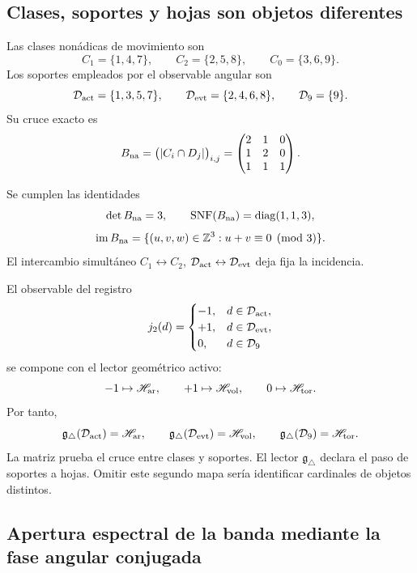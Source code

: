 \subsection{Clases, soportes y hojas son objetos diferentes}

Las clases nonádicas de movimiento son
\[
 C_1=\{1,4,7\},\qquad C_2=\{2,5,8\},\qquad C_0=\{3,6,9\}.
\]
Los soportes empleados por el observable angular son
\[
 \mathcal D_{\rm act}=\{1,3,5,7\},\qquad
 \mathcal D_{\rm evt}=\{2,4,6,8\},\qquad
 \mathcal D_9=\{9\}.
\]
Su cruce exacto es
\[
 B_{\rm na}=\bigl(|C_i\cap D_j|\bigr)_{i,j}
 =\begin{pmatrix}2&1&0\\1&2&0\\1&1&1\end{pmatrix}.
\]

\begin{theorem}
\label{p12-83-c16-s3:thm:incidencia-triadica-corta}
Se cumplen las identidades
\[
 \det B_{\rm na}=3,
 \qquad
 \operatorname{SNF}(B_{\rm na})=\operatorname{diag}(1,1,3),
\]
\[
 \operatorname{im}B_{\rm na}
 =\{(u,v,w)\in\mathbb Z^3:u+v\equiv0\pmod3\}.
\]
El intercambio simultáneo
\(C_1\leftrightarrow C_2\),
\(\mathcal D_{\rm act}\leftrightarrow\mathcal D_{\rm evt}\) deja fija la
incidencia.
\end{theorem}

El observable del registro
\[
 j_2(d)=
 \begin{cases}
 -1,&d\in\mathcal D_{\rm act},\\
 +1,&d\in\mathcal D_{\rm evt},\\
 0,&d\in\mathcal D_9
 \end{cases}
\]
se compone con el lector geométrico activo:
\[
 -1\mapsto\mathscr H_{\rm ar},\qquad
 +1\mapsto\mathscr H_{\rm vol},\qquad
 0\mapsto\mathscr H_{\rm tor}.
\]
Por tanto,
\[
 \mathfrak g_\triangle(\mathcal D_{\rm act})=\mathscr H_{\rm ar},\qquad
 \mathfrak g_\triangle(\mathcal D_{\rm evt})=\mathscr H_{\rm vol},\qquad
 \mathfrak g_\triangle(\mathcal D_9)=\mathscr H_{\rm tor}.
\]
La matriz prueba el cruce entre clases y soportes. El lector
\(\mathfrak g_\triangle\) declara el paso de soportes a hojas. Omitir este
segundo mapa sería identificar cardinales de objetos distintos.

\subsection{Apertura espectral de la banda mediante la fase angular conjugada}


